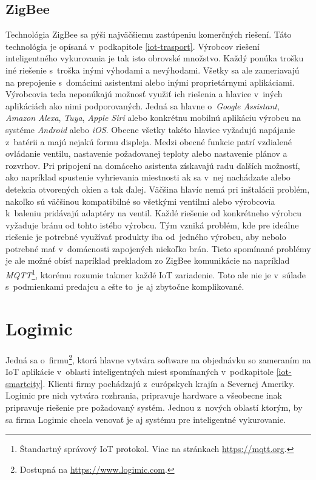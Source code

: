 \subsection*{ZigBee}
Technológia ZigBee sa pýši najväčšiemu zastúpeniu komerčných riešení. 
Táto technológia je opísaná v~podkapitole \ref{iot-trasport}. 
Výrobcov riešení inteligentného vykurovania je tak isto obrovské množstvo. 
Každý ponúka trošku iné riešenie s~troška inými výhodami a nevýhodami. 
Všetky sa ale zameriavajú na prepojenie s~domácimi asistentmi alebo inými proprietárnymi  aplikáciami.
Výrobcovia teda neponúkajú možnosť využiť ich riešenia a hlavice v~iných aplikáciách ako nimi podporovaných. 
Jedná sa hlavne o~\emph{Google Assistant}, \emph{Amazon Alexa}, \emph{Tuya}, \emph{Apple Siri} alebo konkrétnu mobilnú aplikáciu výrobcu na systéme \emph{Android} alebo \emph{iOS}. 
Obecne všetky takéto hlavice vyžadujú napájanie z~batérii a majú nejakú formu displeja. 
Medzi obecné funkcie patrí vzdialené ovládanie ventilu, nastavenie požadovanej teploty alebo nastavenie plánov a rozvrhov. 
Pri pripojení na domáceho asistenta získavajú radu ďalších možností, ako napríklad spustenie vyhrievania miestnosti ak sa v~nej nachádzate alebo detekcia otvorených okien a tak ďalej. 
Väčšina hlavíc nemá pri inštalácii problém, nakoľko sú väčšinou kompatibilné so všetkými ventilmi alebo výrobcovia k~baleniu pridávajú adaptéry na ventil.
Každé riešenie od konkrétneho výrobcu vyžaduje bránu od tohto istého výrobcu. 
Tým vzniká problém, kde pre ideálne riešenie je potrebné využívať produkty iba od~jedného výrobcu, aby nebolo potrebné mať v~domácnosti zapojených niekoľko brán. 
Tieto spomínané problémy je ale možné obísť napríklad prekladom zo ZigBee komunikácie na napríklad \emph{MQTT}\footnote{Štandartný správový IoT protokol. Viac na stránkach \url{https://mqtt.org}.}, ktorému rozumie takmer každé IoT zariadenie.
Toto ale nie je v~súlade s~podmienkami predajcu a ešte to~je aj zbytočne komplikované.

\section{Logimic}\label{Logimic}
Jedná sa o~firmu\footnote{Dostupná na \url{https://www.logimic.com}.}, ktorá hlavne vytvára software na objednávku so zameraním na IoT aplikácie v~oblasti inteligentných miest spomínaných v~podkapitole \ref{iot-smartcity}.
Klienti firmy pochádzajú z~európskych krajín a Severnej Ameriky. 
Logimic pre nich vytvára rozhrania, pripravuje hardware a všeobecne inak pripravuje riešenie pre požadovaný systém. 
Jednou z~nových oblastí ktorým, by sa firma Logimic chcela venovať je aj systému pre inteligentné vykurovanie.

